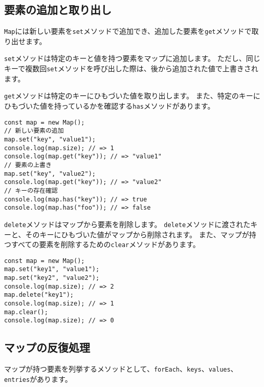 \hypertarget{map-read-and-write}{%
\subsection{要素の追加と取り出し}\label{map-read-and-write}}

\texttt{Map}には新しい要素を\texttt{set}メソッドで追加でき、追加した要素を\texttt{get}メソッドで取り出せます。

\texttt{set}メソッドは特定のキーと値を持つ要素をマップに追加します。
ただし、同じキーで複数回\texttt{set}メソッドを呼び出した際は、後から追加された値で上書きされます。

\texttt{get}メソッドは特定のキーにひもづいた値を取り出します。
また、特定のキーにひもづいた値を持っているかを確認する\texttt{has}メソッドがあります。

\begin{lstlisting}
const map = new Map();
// 新しい要素の追加
map.set("key", "value1");
console.log(map.size); // => 1
console.log(map.get("key")); // => "value1"
// 要素の上書き
map.set("key", "value2");
console.log(map.get("key")); // => "value2"
// キーの存在確認
console.log(map.has("key")); // => true
console.log(map.has("foo")); // => false
\end{lstlisting}

\texttt{delete}メソッドはマップから要素を削除します。
\texttt{delete}メソッドに渡されたキーと、そのキーにひもづいた値がマップから削除されます。
また、マップが持つすべての要素を削除するための\texttt{clear}メソッドがあります。

\begin{lstlisting}
const map = new Map();
map.set("key1", "value1");
map.set("key2", "value2");
console.log(map.size); // => 2
map.delete("key1");
console.log(map.size); // => 1
map.clear();
console.log(map.size); // => 0
\end{lstlisting}

\hypertarget{map-iteration}{%
\subsection{マップの反復処理}\label{map-iteration}}

マップが持つ要素を列挙するメソッドとして、\texttt{forEach}、\texttt{keys}、\texttt{values}、\texttt{entries}があります。

